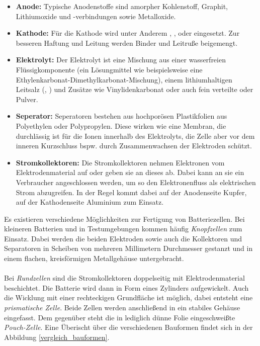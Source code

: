 \documentclass[a4paper, 11pt, headsepline,footsepline,twoside,abstract]{scrbook}
\begin{document}
\begin{itemize}
\item \textbf{Anode:} Typische Anodenstoffe sind amorpher Kohlenstoff, Graphit, Lithiumoxide und -verbind\-ungen sowie Metalloxide. 
\item \textbf{Kathode:} Für die Kathode wird unter Anderem , ,  oder  eingesetzt. Zur besseren Haftung und Leitung werden Binder und Leitruße beigemengt.
\item \textbf{Elektrolyt:}  Der Elektrolyt ist eine Mischung aus einer wasserfreien Flüssigkomponente (ein Lösungmittel wie beispielsweise eine Ethylenkarbonat-Dimethylkarbonat-Mischung), einem lithiumhaltigen Leitsalz (, ) und Zusätze wie Vinylidenkarbonat oder auch fein verteilte  oder  Pulver.
\item \textbf{Seperator:}  Seperatoren bestehen aus hochporösen Plastikfolien aus Polyethylen oder Polypropylen. Diese wirken wie eine Membran, die durchlässig ist für die Ionen innerhalb des Elektrolyts, die Zelle aber vor dem inneren Kurzschluss bspw. durch Zusammenwachsen der Elektroden schützt.
\item \textbf{Stromkollektoren:} Die Stromkollektoren nehmen Elektronen vom Elektrodenmaterial auf oder geben sie an dieses ab. Dabei kann an sie ein Verbraucher angeschlossen werden, um so den Elektronenfluss als elektrischen Strom abzugreifen. In der Regel kommt dabei auf der Anodenseite Kupfer, auf der Kathodenseite Aluminium zum Einsatz.
\end{itemize}
Es existieren verschiedene Möglichkeiten zur Fertigung von Batteriezellen. Bei kleineren Batterien und in Testumgebungen kommen häufig \textit{Knopfzellen} zum Einsatz. Dabei werden die beiden Elektroden sowie auch die Kollektoren und Separatoren in Scheiben von mehreren Millimetern Durchmesser gestanzt und in einem flachen, kreisförmigen Metallgehäuse untergebracht. 
\\\\
Bei \textit{Rundzellen} sind die Stromkollektoren doppelseitig mit Elektrodenmaterial beschichtet. Die Batterie wird dann in Form eines Zylinders aufgewickelt. Auch die Wicklung mit einer rechteckigen Grundfläche ist möglich, dabei entsteht eine \textit{prismatische Zelle}. Beide Zellen werden anschließend in ein stabiles Gehäuse eingefasst. Dem gegenüber steht die in lediglich dünne Folie eingeschweißte \textit{Pouch-Zelle}. Eine Überischt über die verschiedenen Bauformen findet sich in der Abbildung \ref{vergleich_bauformen}.
\end{document}

